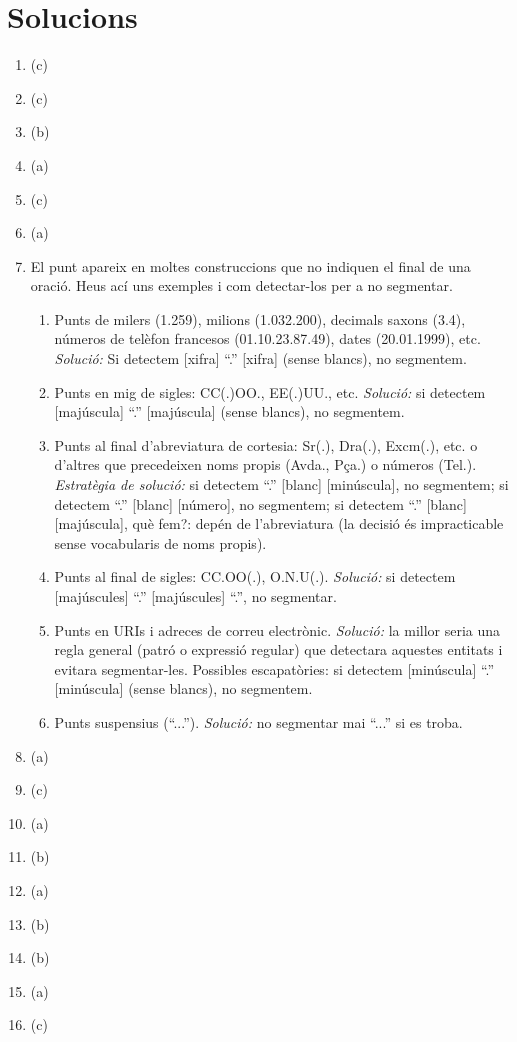 \section{Solucions}
\begin{enumerate}
\item (c)
\item (c)
\item (b)
\item (a)
\item (c)
\item (a)
\item El punt apareix en moltes construccions que no indiquen el final
  de una oració. Heus ací uns exemples i com detectar-los per a no
  segmentar.
  \begin{enumerate}
  \item Punts de milers (1.259), milions (1.032.200), decimals saxons
    (3.4), números de telèfon francesos (01.10.23.87.49), dates
    (20.01.1999), etc. \emph{Solució:} Si detectem [xifra] ``.''
    [xifra] (sense blancs), no segmentem.
     
  \item Punts en mig de sigles: CC(.)OO., EE(.)UU.,
    etc. \emph{Solució:} si detectem [majúscula] ``.'' [majúscula]
    (sense blancs), no segmentem.
     
  \item Punts al final d'abreviatura de cortesia: Sr(.), Dra(.),
    Excm(.), etc. o d'altres que precedeixen noms propis (Avda., Pça.)
    o números (Tel.). \emph{Estratègia de solució:} si detectem ``.''
    [blanc] [minúscula], no segmentem; si detectem ``.'' [blanc]
    [número], no segmentem; si detectem ``.'' [blanc] [majúscula], què
    fem?: depén de l'abreviatura (la decisió és impracticable sense
    vocabularis de noms propis).
  
  \item Punts al final de sigles: CC.OO(.), O.N.U(.). \emph{Solució:}
    si detectem [majúscules] ``.'' [majúscules] ``.'', no segmentar.
     
  \item Punts en URIs i adreces de correu electrònic.  \emph{Solució:}
    la millor seria una regla general (patró o expressió regular) que
    detectara aquestes entitats i evitara segmentar-les.  Possibles
    escapatòries: si detectem [minúscula] ``.'' [minúscula] (sense
    blancs), no segmentem.
     
  \item Punts suspensius (``...''). \emph{Solució:} no segmentar mai
    ``...'' si es troba.     
  \end{enumerate}

\item (a)
\item (c)
\item (a)
\item (b)
\item (a)
\item (b)
\item (b)
\item (a)
\item (c)

\end{enumerate}


